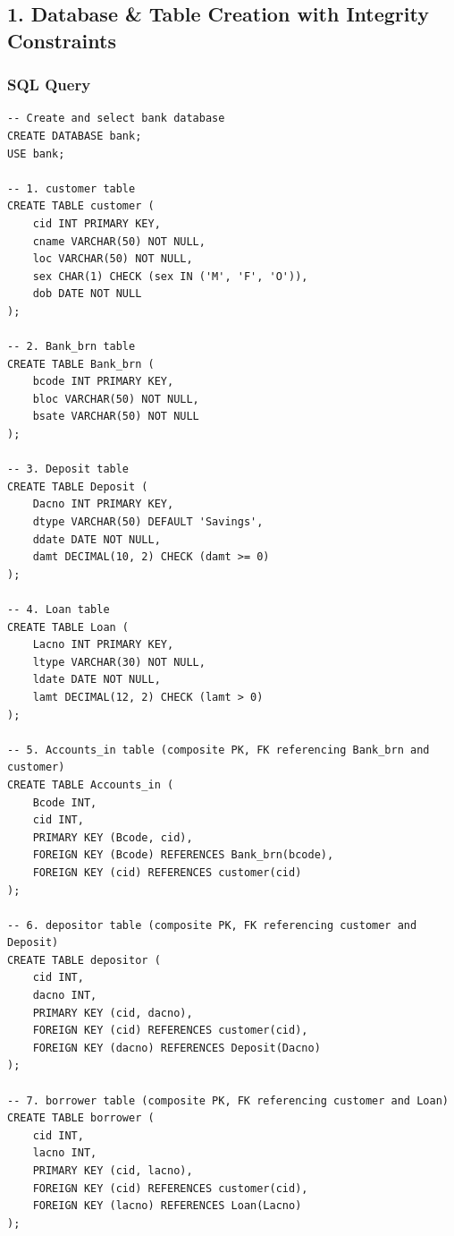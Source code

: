 \subsection*{1. Database \& Table Creation with Integrity Constraints}

\subsubsection*{SQL Query}
\begin{lstlisting}[basicstyle=\ttfamily\footnotesize,caption={Creating bank database and relational tables with integrity constraints}]
-- Create and select bank database
CREATE DATABASE bank;
USE bank;

-- 1. customer table
CREATE TABLE customer (
    cid INT PRIMARY KEY,
    cname VARCHAR(50) NOT NULL,
    loc VARCHAR(50) NOT NULL,
    sex CHAR(1) CHECK (sex IN ('M', 'F', 'O')),
    dob DATE NOT NULL
);

-- 2. Bank_brn table
CREATE TABLE Bank_brn (
    bcode INT PRIMARY KEY,
    bloc VARCHAR(50) NOT NULL,
    bsate VARCHAR(50) NOT NULL
);

-- 3. Deposit table
CREATE TABLE Deposit (
    Dacno INT PRIMARY KEY,
    dtype VARCHAR(50) DEFAULT 'Savings',
    ddate DATE NOT NULL,
    damt DECIMAL(10, 2) CHECK (damt >= 0)
);

-- 4. Loan table
CREATE TABLE Loan (
    Lacno INT PRIMARY KEY,
    ltype VARCHAR(30) NOT NULL,
    ldate DATE NOT NULL,
    lamt DECIMAL(12, 2) CHECK (lamt > 0)
);

-- 5. Accounts_in table (composite PK, FK referencing Bank_brn and customer)
CREATE TABLE Accounts_in (
    Bcode INT,
    cid INT,
    PRIMARY KEY (Bcode, cid),
    FOREIGN KEY (Bcode) REFERENCES Bank_brn(bcode),
    FOREIGN KEY (cid) REFERENCES customer(cid)
);

-- 6. depositor table (composite PK, FK referencing customer and Deposit)
CREATE TABLE depositor (
    cid INT,
    dacno INT,
    PRIMARY KEY (cid, dacno),
    FOREIGN KEY (cid) REFERENCES customer(cid),
    FOREIGN KEY (dacno) REFERENCES Deposit(Dacno)
);

-- 7. borrower table (composite PK, FK referencing customer and Loan)
CREATE TABLE borrower (
    cid INT,
    lacno INT,
    PRIMARY KEY (cid, lacno),
    FOREIGN KEY (cid) REFERENCES customer(cid),
    FOREIGN KEY (lacno) REFERENCES Loan(Lacno)
);
\end{lstlisting}

\vspace{0.2cm}

